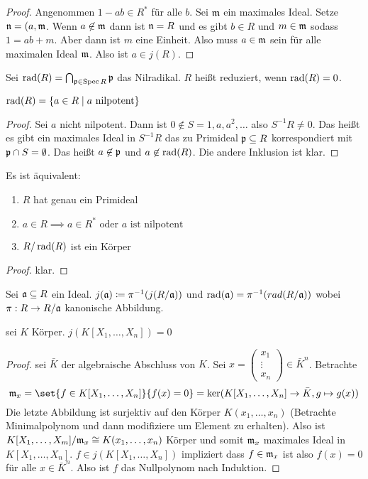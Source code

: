 \begin{proof}
    Angenommen $1-ab\in R^{*}$ für alle $b$. Sei $\mathfrak{m}$ ein maximales Ideal. Setze $\mathfrak{n}=(a,\mathfrak{m}$. Wenn $a\not\in\mathfrak{m}$ dann ist $\mathfrak{n}=R$ und es gibt $b\in R$ und $m\in\mathfrak{m}$ sodass $1=ab+m$. Aber dann ist $m$ eine Einheit. Also muss $a\in\mathfrak{m}$ sein für alle maximalen Ideal $\mathfrak{m}$. Also ist $a\in j(R)$.
\end{proof}
\begin{Def}
    Sei $\operatorname{rad}(R)=\bigcap_{\mathfrak{p}\in \operatorname{Spec} R}\mathfrak{p}$ das Nilradikal. $R$ heißt reduziert, wenn $\operatorname{rad}(R)=0$.
\end{Def}
\begin{Satz}
    $\operatorname{rad}(R)=\{a\in R\mid a \text{ nilpotent}\}$
\end{Satz}
\begin{proof}
    Sei $a$ nicht nilpotent. Dann ist $0\not\in S={1,a,a^2,\dots}$ also $S^{-1}R\neq 0$.
    Das heißt es gibt ein maximales Ideal in $S^{-1}R$ das zu Primideal $\mathfrak{p}\subseteq R$ korrespondiert mit $\mathfrak{p}\cap S=\emptyset$.
    Das heißt $a\not\in\mathfrak{p}$ und $a\not\in \operatorname{rad}(R)$. Die andere Inklusion ist klar.
\end{proof}
\begin{Lemma}
    Es ist äquivalent:
    \begin{enumerate}
        \item $R$ hat genau ein Primideal
        \item $a\in R\implies a\in R^* \text{ oder $a$ ist nilpotent}$
        \item $R/\operatorname{rad}(R)$ ist ein Körper
    \end{enumerate}
\end{Lemma}
\begin{proof}
    klar.
\end{proof}
\begin{Def}
    Sei $\mathfrak{a}\subseteq R$ ein Ideal. $j(\mathfrak{a})\coloneq \pi^{-1}(j(R/\mathfrak{a}))$ und $\operatorname{rad}(\mathfrak{a})=\pi^{-1}(rad(R/\mathfrak{a}))$ wobei $\pi:R\to R/\mathfrak{a}$ kanonische Abbildung.
\end{Def}
\begin{Satz}
    sei $K$ Körper. $j(K[X_1,\dots,X_n])=0$
\end{Satz}
\begin{proof}
    sei $\bar K$ der algebraische Abschluss von $K$.
    Sei $x=\begin{pmatrix}
        x_1\\ \vdots\\ x_n
    \end{pmatrix}\in \bar K^n$. Betrachte 
    $$\frakm_x=\set{f\in K[X_1,\dots,X_n]}{f(x)=0}=\ker(K[X_1,\dots,X_n]\to\bar K, g\mapsto g(x))$$
    Die letzte Abbildung ist surjektiv auf den Körper $K(x_1,\dots,x_n)$ (Betrachte Minimalpolynom und dann modifiziere um Element zu erhalten).
    Also ist $K[X_1,\dots,X_m]/\mathfrak{m}_x\cong K(x_1,\dots,x_n)$ Körper und somit $\mathfrak{m}_x$ maximales Ideal in $K[X_1,\dots,X_n]$.
    $f\in j(K[X_1,\dots,X_n])$ impliziert dass $f\in\mathfrak{m}_x$ ist also $f(x)=0$ für alle $x\in\bar K^{n}$. Also ist $f$ das Nullpolynom nach Induktion.
\end{proof}
